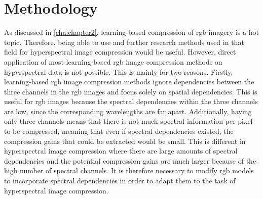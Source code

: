 \chapter{Methodology\label{cha:chapter4}}
As discussed in \autoref{cha:chapter2}, learning-based compression of \ac{rgb} imagery is a hot topic. Therefore, being able to use and further research methods used in that field for hyperspectral image compression would be useful. However, direct application of most learning-based \ac{rgb} image compression methods on hyperspectral data is not possible. This is mainly for two reasons. Firstly, learning-based \ac{rgb} image compression methods ignore dependencies between the three channels in the \ac{rgb} images and focus solely on spatial dependencies. This is useful for \ac{rgb} images because the spectral dependencies within the three channels are low, since the corresponding wavelengths are far apart. Additionally, having only three channels means that there is not much spectral information per pixel to be compressed, meaning that even if spectral dependencies existed, the compression gains that could be extracted would be small. This is different in hyperspectral image compression where there are large amounts of spectral dependencies and the potential compression gains are much larger because of the high number of spectral channels. It is therefore necessary to modify \ac{rgb} models to incorporate spectral dependencies in order to adapt them to the task of hyperspectral image compression. 

